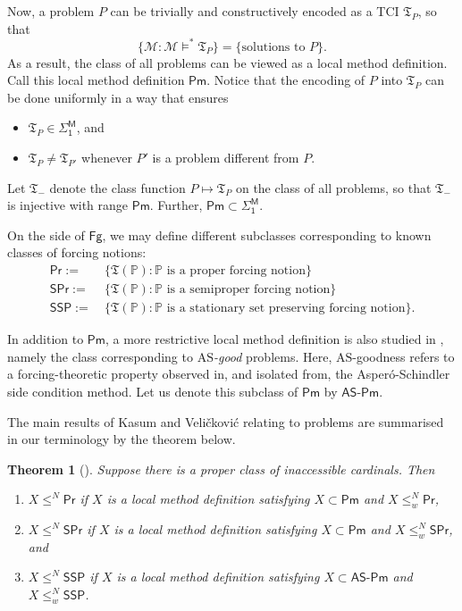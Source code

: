 \documentclass[12pt, twoside]{memoir}
\numberwithin{equation}{section}
\newtheorem{thm}{Theorem}[section]
\theoremstyle{definition}
\theoremstyle{remark}
\theoremstyle{definition}
\theoremstyle{definition}
\theoremstyle{definition}
\theoremstyle{remark}
\begin{document}
Now, a problem $P$ can be trivially and constructively encoded as a TCI $\mathfrak{T}_P$, so that
\begin{equation*}
    \{\mathcal{M} : \mathcal{M} \models^* \mathfrak{T}_P\} = \{\text{solutions to } P\} \text{.}
\end{equation*}
As a result, the class of all problems can be viewed as a local method definition. Call this local method definition $\mathsf{Pm}$. Notice that the encoding of $P$ into $\mathfrak{T}_P$ can be done uniformly in a way that ensures 
\begin{itemize}
    \item $\mathfrak{T}_P \in \mathsf{\Sigma^M_1}$, and
    \item $\mathfrak{T}_P \neq \mathfrak{T}_{P'}$ whenever $P'$ is a problem different from $P$.
\end{itemize}
Let $\mathfrak{T}_{-}$ denote the class function $P \mapsto \mathfrak{T}_P$ on the class of all problems, so that $\mathfrak{T}_{-}$ is injective with range $\mathsf{Pm}$. Further, $\mathsf{Pm} \subset \mathsf{\Sigma^M_1}$. 

On the side of $\mathsf{Fg}$, we may define different subclasses corresponding to known classes of forcing notions:
\begin{align*}
    \mathsf{Pr} := \ & \{\mathfrak{T}(\mathbb{P}) : \mathbb{P} \text{ is a proper forcing notion}\} \\
    \mathsf{SPr} := \ & \{\mathfrak{T}(\mathbb{P}) : \mathbb{P} \text{ is a semiproper forcing notion}\} \\
    \mathsf{SSP} := \ & \{\mathfrak{T}(\mathbb{P}) : \mathbb{P} \text{ is a stationary set preserving forcing notion}\} \text{.}
\end{align*}

In addition to $\mathsf{Pm}$, a more restrictive local method definition is also studied in \cite{kasum}, namely the class corresponding to \emph{$\mathrm{AS}$-good} problems. Here, $\mathrm{AS}$-goodness refers to a forcing-theoretic property observed in, and isolated from, the Asper\'{o}-Schindler side condition method. Let us denote this subclass of $\mathsf{Pm}$ by $\mathsf{AS\text{-}Pm}$. 

The main results of Kasum and Veli\v{c}kovi\'{c} relating to problems are summarised in our terminology by the theorem below.

\begin{thm}[\cite{kasum}]\label{thm9521}
Suppose there is a proper class of inaccessible cardinals. Then 
\begin{enumerate}[label=(\arabic*)]
    \item $X \leq^N \mathsf{Pr}$ if $X$ is a local method definition satisfying $X \subset \mathsf{Pm}$ and $X \leq^N_w \mathsf{Pr}$,
    \item $X \leq^N \mathsf{SPr}$ if $X$ is a local method definition satisfying $X \subset \mathsf{Pm}$ and $X \leq^N_w \mathsf{SPr}$, and
    \item $X \leq^N \mathsf{SSP}$ if $X$ is a local method definition satisfying $X \subset \mathsf{AS\text{-}Pm}$ and $X \leq^N_w \mathsf{SSP}$.
\end{enumerate}
\end{thm}
\end{document}
